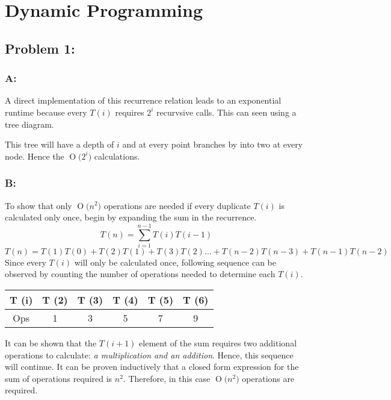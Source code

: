 \documentclass[12pt]{article}
\newcommand{\BigO}[1]{\ensuremath{\operatorname{O}\bigl(#1\bigr)}}
\begin{document}
\section*{Dynamic Programming}
\subsection*{Problem 1:}
\subsubsection*{A:}
A direct implementation of this recurrence relation leads to an exponential
runtime because every $T(i)$ requires $2^{i}$ recurvsive calls.  This can
seen using a tree diagram.\\ 
\begin{center}
\end{center}    
This tree will have a depth of $i$ and at every point branches by into 
two at every node.  Hence the \BigO{2^{i}} calculations. 

\subsubsection*{B:}
To show that only \BigO{n^2} operations are needed if every duplicate
$T(i)$ is calculated only once, begin by expanding the sum in the 
recurrence.
\[
T(n) = \sum_{i=1}^{n-1}T(i)T(i-1)
\]
\[ 
T(n) = T(1)T(0) + T(2)T(1) + T(3)T(2)\dots
+ T(n-2)T(n-3) + T(n-1)T(n-2)
\]
Since every $T(i)$ will only be calculated once, following sequence
can be observed by counting the number of operations needed to determine
each $T(i)$.

\begin{center}
    \begin{tabular}{c| c c c c c}
    T (i) & T (2) & T (3) & T (4) & T (5) & T (6) \\ \hline  
    Ops & 1 & 3 & 5 & 7 & 9 \\
    \end{tabular}
\end{center}
It can be shown that the $T(i+1)$ element of the sum requires two additional
operations to calculate: \textit{a multiplication and an addition}.  Hence,
this sequence will continue.  It can be proven inductively that a closed
form expression for the sum of operations required is $n^2$.  Therefore,
in this case \BigO{n^2} operations are required. 
\end{document}
